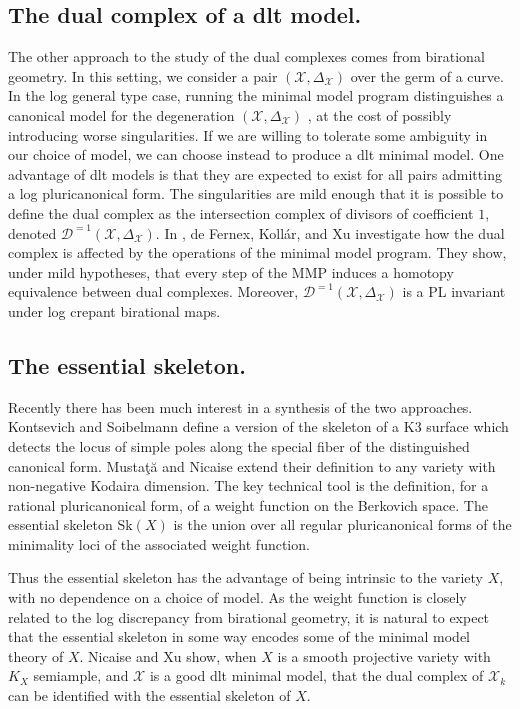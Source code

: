 \documentclass{amsart}%
\numberwithin{equation}{subsection}
\theoremstyle{plain2}
\theoremstyle{definition2}
\theoremstyle{stepstyle}
\theoremstyle{point}
\theoremstyle{subpoint}
\newcommand{\D}{{\mathcal D}}
\newcommand{\cX}{\ensuremath{\mathscr{X}}}
\newcommand{\Sk}{\mathrm{Sk}}
\begin{document}
\subsection{The dual complex of a dlt model.} The other approach to the study of the dual complexes comes from birational geometry. In this setting, we consider a pair $(\cX, \Delta_\cX)$ over the germ of a curve. In the log general type case, running the minimal model program distinguishes a canonical model for the degeneration $(\cX, \Delta_\cX)$ \cite{Alexeev, KollarShepherd-Barron, HaconMcKernanXu}, at the cost of possibly introducing worse singularities. If we are willing to tolerate some ambiguity in our choice of model, we can choose instead to produce a dlt minimal model. One advantage of dlt models is that they are expected to exist for all pairs admitting a log pluricanonical form. The singularities are mild enough that it is possible to define the dual complex as the intersection complex of divisors of coefficient $1$, denoted $\D^{=1}(\cX,\Delta_\cX)$. In \cite{deFernexKollarXu2012}, de Fernex, Koll{\'a}r, and Xu investigate how the dual complex is affected by the operations of the minimal model program. They show, under mild hypotheses, that every step of the MMP induces a homotopy equivalence between dual complexes. Moreover, $\D^{=1}(\cX,\Delta_\cX)$ is a PL invariant under log crepant birational maps.

\subsection{The essential skeleton.} Recently there has been much interest in a synthesis of the two approaches. Kontsevich and Soibelmann \cite{KontsevichSoibelman} define a version of the skeleton of a K3 surface which detects the locus of simple poles along the special fiber of the distinguished canonical form. Musta{\c{t}}{\u{a}} and Nicaise \cite{MustataNicaise} extend their definition to any variety with non-negative Kodaira dimension. The key technical tool is the definition, for a rational pluricanonical form, of a weight function on the Berkovich space. The essential skeleton $\Sk(X)$ is the union over all regular pluricanonical forms of the minimality loci of the associated weight function.

Thus the essential skeleton has the advantage of being intrinsic to the variety $X$, with no dependence on a choice of model. As the weight function is closely related to the log discrepancy from birational geometry, it is natural to expect that the essential skeleton in some way encodes some of the minimal model theory of $X$. Nicaise and Xu \cite{NicaiseXu} show, when $X$ is a smooth projective variety with $K_X$ semiample, and $\cX$ is a good dlt minimal model, that the dual complex of $\cX_k$ can be identified with the essential skeleton of $X$.
\end{document}
